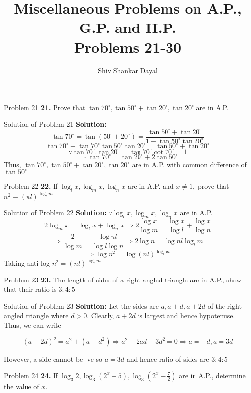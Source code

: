 \documentclass[aspectratio=1610,8pt]{beamer}
\title{Miscellaneous Problems on A.P., G.P. and H.P.\\Problems 21-30}
\author[Shiv Shankar Dayal]{Shiv Shankar Dayal}
\begin{document}
\begin{frame}
  \titlepage
\end{frame}
\begin{frame}{Problem 21}
  \textbf{21.} Prove that $\tan 70^\circ, \tan 50^\circ + \tan 20^\circ, \tan 20^\circ$ are in A.P.
\end{frame}
\begin{frame}{Solution of Problem 21}
  \textbf{Solution:} $$\tan70^\circ = \tan(50^\circ + 20^\circ) = \frac{\tan50^\circ + \tan 20^\circ}{1 - \tan50^\circ\tan20^\circ}$$
  $$\tan70^\circ - \tan70^\circ\tan50^\circ\tan20^\circ = \tan50^\circ + \tan 20^\circ$$
  $$\because \tan70^\circ.\tan20^\circ = \tan70^\circ\cot70^\circ = 1$$
  $$\Rightarrow \tan70^\circ = \tan20^\circ + 2\tan50^\circ$$
  Thus, $\tan 70^\circ, \tan 50^\circ + \tan 20^\circ, \tan 20^\circ$ are in A.P. with common difference of $\tan50^\circ.$
\end{frame}
\begin{frame}{Problem 22}
  \textbf{22.} If $\log_l x, \log_m x, \log_n x$ are in A.P. and $x \neq 1,$ prove that $n^2 = (nl)^{\log_l m}$
\end{frame}
\begin{frame}{Solution of Problem 22}
  \textbf{Solution:} $\because \log_l x, \log_m x, \log_n x$ are in A.P.
  $$2\log_m x = \log_l x + \log_n x \Rightarrow 2\frac{\log x}{\log m} = \frac{\log x}{\log l} + \frac{\log x}{\log n}$$
  $$\Rightarrow \frac{2}{\log m} = \frac{\log nl}{\log l\log n}\Rightarrow 2\log n = \log nl\log_l m$$
  $$\Rightarrow \log n^2 = \log (nl)^{\log_l m}$$
  Taking anti-log $n^2 = (nl)^{\log_l m}$
\end{frame}
\begin{frame}{Problem 23}
  \textbf{23.} The length of sides of a right angled triangle are in A.P., show that their ratio is $3:4:5$
\end{frame}
\begin{frame}{Solution of Problem 23}
  \textbf{Solution:} Let the sides are $a, a + d, a + 2d$ of the right angled triangle where $d > 0$. Clearly, $a + 2d$ is largest and hence
  hypotenuse. Thus, we can write

  $$(a + 2d)^2 = a^2 + (a + d^2) \Rightarrow a^2 - 2ad - 3d^2 = 0 \Rightarrow a = -d, a = 3d$$

  However, a side cannot be -ve so $a = 3d$ and hence ratio of sides are $3:4:5$
\end{frame}
\begin{frame}{Problem 24}
  \textbf{24.} If $\log_3 2, \log_3(2^x - 5), \log_3\left(2^x - \frac{7}{2}\right)$ are in A.P., determine the value of $x.$
\end{frame}
\end{document}
